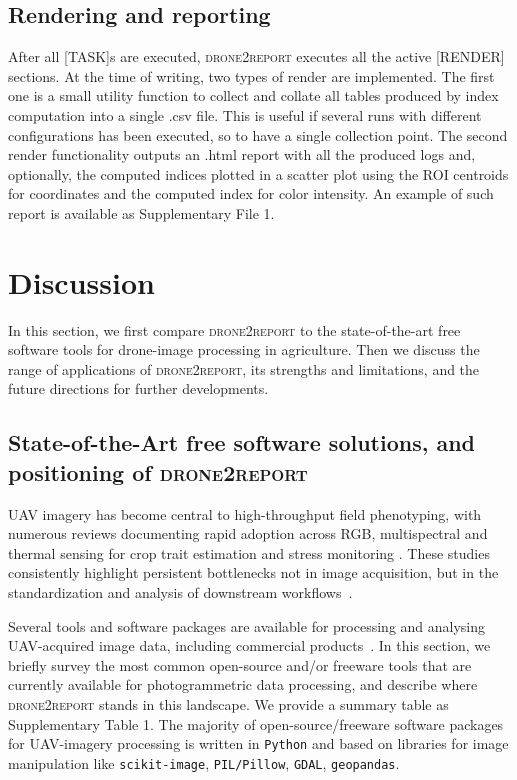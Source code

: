 \documentclass[drones,technicalnote,accept,pdftex,moreauthors]{Definitions/mdpi}
\begin{document}
\subsection{Rendering and reporting}
\label{rendering}

After all [TASK]s are executed, \textsc{drone2report} executes all the active [RENDER] sections. At the time of writing, two types of render are implemented. The first one is a small utility function to collect and collate all tables produced by index computation into a single .csv file. This is useful if several runs with different configurations has been executed, so to have a single collection point. The second render functionality outputs an .html report with all the produced logs and, optionally, the computed indices plotted in a scatter plot using the ROI centroids for coordinates and the computed index for color intensity. An example of such report is available as Supplementary File 1.

\section{Discussion}
\label{discussion}
In this section, we first compare \textsc{drone2report} to the state-of-the-art free software tools for drone-image processing in agriculture. Then we discuss the range of applications of \textsc{drone2report}, its strengths and limitations, and the future directions for further developments.

\subsection{State-of-the-Art free software solutions, and positioning of \textsc{drone2report}}
UAV imagery has become central to high-throughput field phenotyping, with numerous reviews documenting rapid adoption across RGB, multispectral and thermal sensing for crop trait estimation and stress monitoring \cite{tanaka_review_2024, gano2024drone}. 
These studies consistently highlight persistent bottlenecks not in image acquisition, but in the standardization and analysis of downstream workflows~\cite{gano_dronebased_2024}.

Several tools and software packages are available for processing and analysing UAV-acquired image data, including commercial products~\cite{sharma2021development}. 
In this section, we briefly survey the most common open-source and/or freeware tools that are currently available for photogrammetric data processing, and describe where \textsc{drone2report} stands in this landscape. We provide a summary table as Supplementary Table 1.
The majority of open-source/freeware software packages for UAV-imagery processing is written in \texttt{Python} and based on libraries for image manipulation like \texttt{scikit-image}, \texttt{PIL/Pillow}, \texttt{GDAL}, \texttt{geopandas}.
\end{document}
